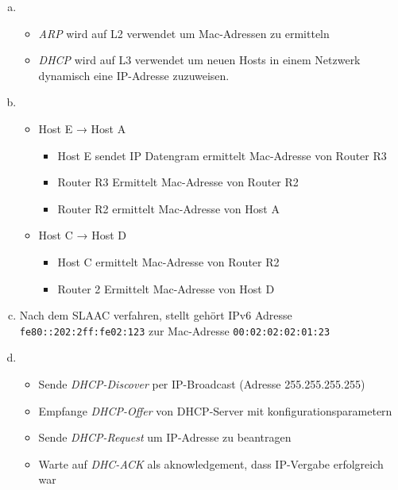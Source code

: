 \begin{enumerate}[a)]
	
	\item \begin{itemize}
		\item \textit{ARP} wird auf L2 verwendet um Mac-Adressen zu ermitteln
		\item \textit{DHCP} wird auf L3 verwendet um neuen Hosts in einem Netzwerk 
		dynamisch eine IP-Adresse zuzuweisen.
	\end{itemize}
	
	\item 
	\begin{itemize} 
		\item Host E → Host A 
		\begin{itemize}
			\item Host E sendet IP Datengram ermittelt Mac-Adresse von Router R3
			\item Router R3 Ermittelt Mac-Adresse von Router R2
			\item Router R2 ermittelt Mac-Adresse von Host A
		\end{itemize}
		\item Host C → Host D
		\begin{itemize}
			\item Host C ermittelt Mac-Adresse von Router R2
			\item Router 2 Ermittelt Mac-Adresse von Host D
		\end{itemize}
	\end{itemize}

	\item Nach dem SLAAC verfahren, stellt gehört IPv6 Adresse \texttt{fe80::202:2ff:fe02:123} zur Mac-Adresse \texttt{00:02:02:02:01:23}
	
	\item \begin{itemize}
		\item Sende \textit{DHCP-Discover} per IP-Broadcast (Adresse 255.255.255.255)
		\item Empfange \textit{DHCP-Offer} von DHCP-Server mit konfigurationsparametern
		\item Sende \textit{DHCP-Request} um IP-Adresse zu beantragen
		\item Warte auf \textit{DHC-ACK} als aknowledgement, dass IP-Vergabe erfolgreich war
	\end{itemize}

\end{enumerate}

